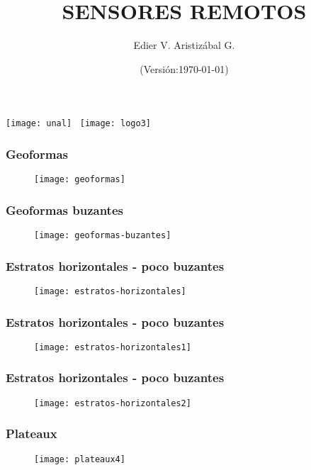 \documentclass[14pt]{beamer}
\title[Fotogeología]{SENSORES REMOTOS}
\author[Edier Aristizábal]{Edier V. Aristizábal G.}
\institute{\emph{evaristizabalg@unal.edu.co}}
\date{(Versión:\today)}
\begin{document}
\begin{frame}
\titlepage
\centering
	\texttt{[image: unal]}\hspace*{4.75cm}~%
   	\texttt{[image: logo3]} 
\end{frame}
  \begin{frame}
\frametitle{Geoformas}
 \begin{figure}
    \centering
    \texttt{[image: geoformas]}
  \end{figure}
\end{frame}
  \begin{frame}
\frametitle{Geoformas buzantes}
 \begin{figure}
    \centering
    \texttt{[image: geoformas-buzantes]}
  \end{figure}
\end{frame}
  \begin{frame}
\frametitle{Estratos horizontales - poco buzantes}
 \begin{figure}
    \centering
    \texttt{[image: estratos-horizontales]}
  \end{figure}
\end{frame}
  \begin{frame}
\frametitle{Estratos horizontales - poco buzantes}
 \begin{figure}
    \centering
    \texttt{[image: estratos-horizontales1]}
  \end{figure}
\end{frame}
  \begin{frame}
\frametitle{Estratos horizontales - poco buzantes}
 \begin{figure}
    \centering
    \texttt{[image: estratos-horizontales2]}
  \end{figure}
\end{frame}
  \begin{frame}
\frametitle{Plateaux}
 \begin{figure}
    \centering
    \texttt{[image: plateaux4]}
  \end{figure}
\end{frame}
\end{document}
